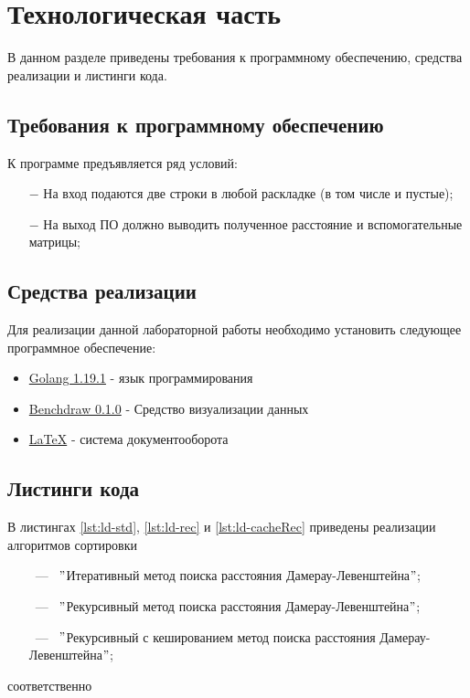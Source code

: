 \chapter{Технологическая часть}

В данном разделе приведены требования к программному обеспечению, средства реализации и листинги кода.

\section{Требования к программному обеспечению}
К программе предъявляется ряд условий:
\begin{itemize}
    \item[$-$] На вход подаются две строки в любой раскладке (в том числе и пустые);
    \item[$-$] На выход ПО должно выводить полученное расстояние и вспомогательные матрицы;
\end{itemize}

\section{Средства реализации}
Для реализации данной лабораторной работы необходимо установить следующее программное обеспечение:
\begin{itemize}
    \item \href{https://go.dev/}{Golang 1.19.1} - язык программирования
    \item \href{https://github.com/cep21/benchdraw}{Benchdraw 0.1.0} - Средство визуализации данных
    \item \href{https://www.latex-project.org/}{LaTeX} - система документооборота
\end{itemize}

\section{Листинги кода}
В листингах \ref{lst:ld-std}, \ref{lst:ld-rec} и \ref{lst:ld-cacheRec} приведены реализации алгоритмов
сортировки
\begin{itemize}
    \item[~---~] \("\)Итеративный метод поиска расстояния Дамерау-Левенштейна\("\);
    \item[~---~] \("\)Рекурсивный метод поиска расстояния Дамерау-Левенштейна\("\);
    \item[~---~] \("\)Рекурсивный с кешированием метод поиска расстояния Дамерау-Левенштейна\("\);
\end{itemize}
соответственно
\newpage
